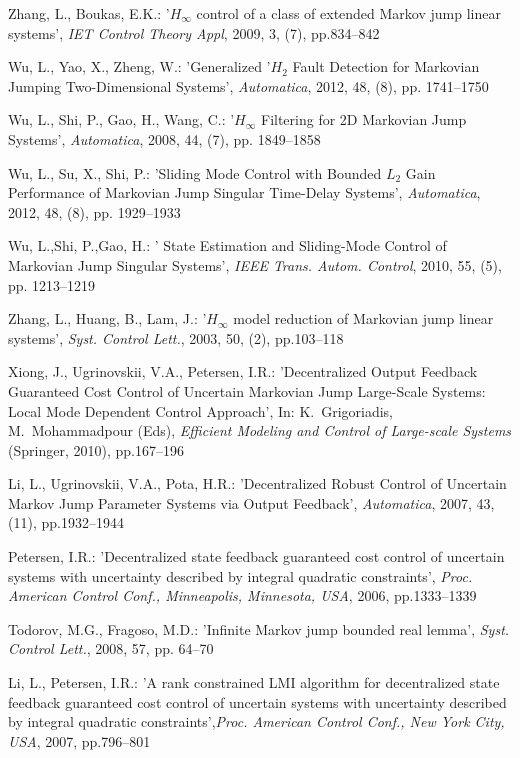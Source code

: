 \documentclass[11pt,draftcls,onecolumn]{IEEEtran}
\begin{document}
\begin{thebibliography}{0}
Zhang, L., Boukas, E.K.: '$H_\infty$ control of a class of extended Markov jump linear systems', \emph{IET Control Theory Appl}, 2009, 3, (7), pp.834--842

 Wu, L., Yao, X., Zheng, W.: 'Generalized '$H_{2}$ Fault Detection for Markovian Jumping
Two-Dimensional Systems', \emph{Automatica}, 2012, 48, (8), pp. 1741--1750

Wu, L., Shi, P., Gao, H., Wang, C.: '$H_{\infty}$ Filtering for 2D Markovian Jump Systems', \emph{Automatica}, 2008, 44, (7), pp. 1849--1858

 Wu, L., Su, X., Shi, P.: 'Sliding Mode Control with Bounded $L_{2}$ Gain Performance of Markovian
Jump Singular Time-Delay Systems', \emph{Automatica}, 2012, 48, (8), pp.
1929--1933

 Wu, L.,Shi, P.,Gao, H.: ' State Estimation and Sliding-Mode Control of Markovian Jump
Singular Systems', \emph{IEEE Trans. Autom. Control}, 2010, 55, (5), pp. 1213--1219

Zhang, L., Huang, B., Lam, J.: '$H_{\infty}$ model reduction of Markovian jump
linear systems', \emph{Syst. Control Lett.}, 2003, 50, (2), pp.103--118

Xiong, J., Ugrinovskii, V.A., Petersen, I.R.: 'Decentralized Output Feedback Guaranteed Cost Control of Uncertain Markovian Jump Large-Scale Systems: Local Mode Dependent Control Approach', In: K.~Grigoriadis, M.~Mohammadpour (Eds), \emph{Efficient Modeling and Control of Large-scale Systems} (Springer, 2010), pp.167--196



Li, L., Ugrinovskii, V.A., Pota, H.R.: 'Decentralized Robust Control of Uncertain Markov Jump Parameter Systems via Output Feedback', \emph{Automatica}, 2007, 43, (11), pp.1932--1944

Petersen, I.R.: 'Decentralized state feedback guaranteed cost control of uncertain systems with uncertainty described by integral quadratic constraints',  \emph{Proc. American Control Conf.,
Minneapolis, Minnesota, USA}, 2006, pp.1333--1339


Todorov, M.G., Fragoso,  M.D.: 'Infinite Markov jump bounded real lemma', \emph{Syst. Control Lett.},  2008, 57, pp. 64--70

Li, L., Petersen, I.R.: 'A rank constrained LMI algorithm for decentralized state feedback guaranteed cost control of uncertain systems with uncertainty described by integral quadratic constraints',\emph{Proc. American Control Conf.,
New York City, USA}, 2007, pp.796--801




\end{thebibliography}
\end{document}
